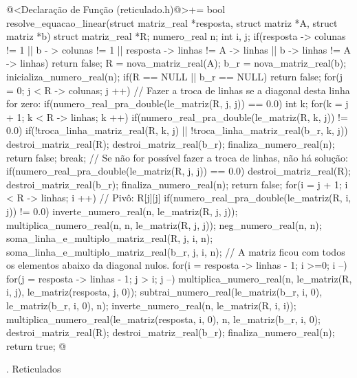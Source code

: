 \iniciocodigo
@<Declaração de Função (reticulado.h)@>+=
bool resolve_equacao_linear(struct matriz_real *resposta,
                           struct matriz *A, struct matriz *b){
  struct matriz_real *R;
  numero_real n;
  int i, j;
  if(resposta -> colunas != 1 || b - > colunas != 1 ||
     resposta -> linhas != A -> linhas || b -> linhas != A -> linhas)
    return false;
  R = nova_matriz_real(A);
  b_r = nova_matriz_real(b);
  inicializa_numero_real(n);
  if(R == NULL || b_r == NULL)
    return false;
  for(j = 0; j < R -> colunas; j ++){
    // Fazer a troca de linhas se a diagonal desta linha for zero:
    if(numero_real_pra_double(le_matriz(R, j, j)) == 0.0){
      int k;
      for(k = j + 1; k < R -> linhas; k ++){
        if(numero_real_pra_double(le_matriz(R, k, j)) != 0.0){
          if(!troca_linha_matriz_real(R, k, j) ||
             !troca_linha_matriz_real(b_r, k, j)){
            destroi_matriz_real(R);
            destroi_matriz_real(b_r);
            finaliza_numero_real(n);
            return false;
          }
          break;
        }
        // Se não for possível fazer a troca de linhas, não há solução:
        if(numero_real_pra_double(le_matriz(R, j, j)) == 0.0){
          destroi_matriz_real(R);
          destroi_matriz_real(b_r);
          finaliza_numero_real(n);
          return false;
        }
      }
    }
    for(i = j + 1; i < R -> linhas; i ++){
      // Pivô: R[j][j]
      if(numero_real_pra_double(le_matriz(R, i, j)) != 0.0){
        inverte_numero_real(n, le_matriz(R, j, j));
        multiplica_numero_real(n, n, le_matriz(R, j, j));
        neg_numero_real(n, n);
        soma_linha_e_multiplo_matriz_real(R, j, i, n);
        soma_linha_e_multiplo_matriz_real(b_r, j, i, n);
      }
    }
  }
  // A matriz ficou com todos os elementos abaixo da diagonal nulos.
  for(i = resposta -> linhas - 1; i >=0; i --){
    for(j = resposta -> linhas - 1; j > i; j --){
      multiplica_numero_real(n, le_matriz(R, i, j),
                             le_matriz(resposta, j, 0));
      subtrai_numero_real(le_matriz(b_r, i, 0), le_matriz(b_r, i, 0), n);
    }
    inverte_numero_real(n, le_matriz(R, i, i));
    multiplica_numero_real(le_matriz(resposta, i, 0), n,
                           le_matriz(b_r, i, 0);
  }
  destroi_matriz_real(R);
  destroi_matriz_real(b_r);
  finaliza_numero_real(n);
  return true;
}
@
\fimcodigo



{\twelvebold {}. Reticulados}


\vskip0.5cm

